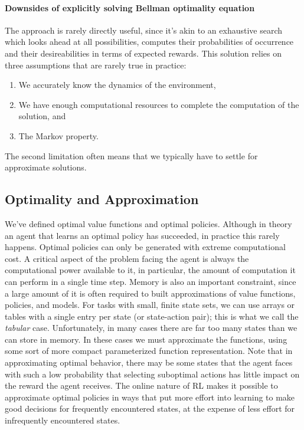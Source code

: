 \documentclass[12pt]{article}
\begin{document}
\paragraph{Downsides of explicitly solving Bellman optimality equation} The approach is rarely directly useful, since it's akin to an exhaustive search which looks ahead at all possibilities, computes their probabilities of occurrence and their desireabilities in terms of expected rewards. This solution relies on three assumptions that are rarely true in practice:
\begin{enumerate}
\item We accurately know the dynamics of the environment,
\item We have enough computational resources to complete the computation of the   solution, and
\item The Markov property.
\end{enumerate}
The second limitation often means that we typically have to settle for approximate solutions.
\subsection{Optimality and Approximation}
We've defined optimal value functions and optimal policies. Although in theory an agent that learns an optimal policy has succeeded, in practice this rarely happens. Optimal policies can only be generated with extreme computational cost. A critical aspect of the problem facing the agent is always the computational power available to it, in particular, the amount of computation it can perform in a single time step. Memory is also an important constraint, since a large amount of it is often required to built approximations of value functions, policies, and models. For tasks with small, finite state sets, we can use arrays or tables with a single entry per state (or state-action pair); this is what we call the \emph{tabular} case. Unfortunately, in many cases there are far too many states than we can store in memory. In these cases we must approximate the functions, using some sort of more compact parameterized function representation. Note that in approximating optimal behavior, there may be some states that the agent faces with such a low probability that selecting suboptimal actions has little impact on the reward the agent receives. The online nature of RL makes it possible to approximate optimal policies in ways that put more effort into learning to make good decisions for frequently encountered states, at the expense of less effort for infrequently encountered states.
\end{document}
